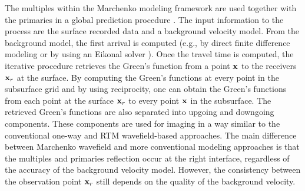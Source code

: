 The multiples within the Marchenko modeling framework are used 
together with the primaries in a global prediction procedure \citep{Behura,Wapenaar,Singh2015}.
The input information to the process are the surface recorded data and 
a background velocity model. From the background model, the first arrival is 
computed (e.g., by direct finite difference modeling or by using an Eikonal solver \citep{Behura}). Once 
the travel time is computed, the iterative procedure retrieves the Green's function 
from a point ${\bf x}$ to the receivers ${\bf x}_r$ at the surface. By 
computing the Green's functions at every point in the subsurface grid and  by using 
reciprocity, one can obtain the Green's functions from each point at the surface ${\bf x}_r$ to 
every point ${\bf x}$ in the subsurface. The retrieved Green's functions are also separated 
into upgoing and downgoing components. These components are used for imaging 
in a way similar to the conventional one-way and RTM wavefield-based approaches. 
 The main difference between Marchenko wavefield and more conventional modeling approaches is that
the multiples and primaries reflection occur at the right interface, regardless of the 
accuracy of the background velocity model. However, the consistency between the observation 
point ${\bf x}_r$ still depends on the quality of the background velocity. 




